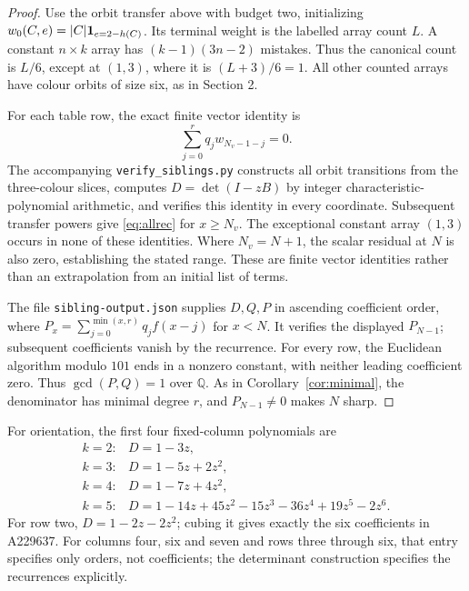 \begin{proof}
Use the orbit transfer above with budget two, initializing
$w_0(C,e)=|C|\mathbf{1}_{e=2-h(C)}$. Its terminal weight is the labelled
array count $L$. A constant $n\times k$ array has $(k-1)(3n-2)$
mistakes. Thus the canonical count is $L/6$, except at $(1,3)$,
where it is $(L+3)/6=1$. All other counted arrays have colour orbits
of size six, as in Section 2.

For each table row, the exact finite vector identity is
\[
\sum_{j=0}^{r}q_j w_{N_v-1-j}=0.
\]
The accompanying \texttt{verify\_siblings.py} constructs all orbit
transitions from the three-colour slices, computes $D=\det(I-zB)$
by integer characteristic-polynomial arithmetic, and verifies this
identity in every coordinate. Subsequent transfer powers give
\eqref{eq:allrec} for $x\geq N_v$.
The exceptional constant array $(1,3)$ occurs in none of these identities.
Where $N_v=N+1$, the scalar residual at $N$ is also zero, establishing
the stated range. These are finite vector identities rather than an
extrapolation from an initial list of terms.

The file \texttt{sibling-output.json} supplies $D,Q,P$ in ascending
coefficient order, where
$P_x=\sum_{j=0}^{\min(x,r)}q_jf(x-j)$ for $x<N$.
It verifies the displayed $P_{N-1}$; subsequent coefficients vanish
by the recurrence. For every row, the Euclidean algorithm modulo
$101$ ends in a nonzero constant, with neither leading coefficient
zero. Thus $\gcd(P,Q)=1$ over $\mathbb Q$.
As in Corollary~\ref{cor:minimal}, the denominator has minimal degree
$r$, and $P_{N-1}\ne0$ makes $N$ sharp.
\end{proof}

For orientation, the first four fixed-column polynomials are
\[
\begin{array}{ll}
k=2:&D=1-3z,\\
k=3:&D=1-5z+2z^2,\\
k=4:&D=1-7z+4z^2,\\
k=5:&D=1-14z+45z^2-15z^3-36z^4+19z^5-2z^6.
\end{array}
\]
For row two, $D=1-2z-2z^2$; cubing it gives exactly the six
coefficients in A229637. For columns four, six and seven and rows
three through six, that entry specifies only orders, not coefficients;
the determinant construction specifies the recurrences explicitly.

